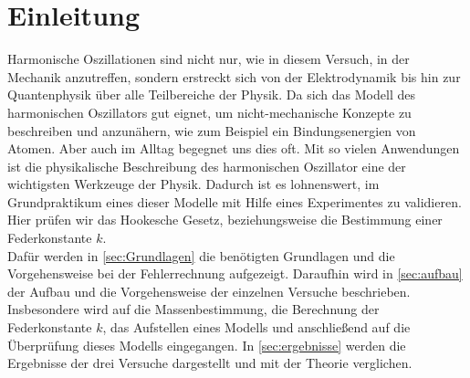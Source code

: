 \chapter{Einleitung}
\label{sec:einleitung}

Harmonische Oszillationen sind nicht nur, wie in diesem Versuch, in der Mechanik anzutreffen, sondern erstreckt sich von der Elektrodynamik bis hin zur Quantenphysik über alle Teilbereiche der Physik. Da sich das Modell des harmonischen Oszillators gut eignet, um nicht-mechanische Konzepte zu beschreiben und anzunähern, wie zum Beispiel ein Bindungsenergien von Atomen. Aber auch im Alltag begegnet uns dies oft. Mit so vielen Anwendungen ist die physikalische Beschreibung des harmonischen Oszillator eine der wichtigsten Werkzeuge der Physik. Dadurch ist es lohnenswert, im Grundpraktikum eines dieser Modelle mit Hilfe eines Experimentes zu validieren. Hier prüfen wir das Hookesche Gesetz, beziehungsweise die Bestimmung einer Federkonstante $k$.\\
Dafür werden in \autoref{sec:Grundlagen} die benötigten Grundlagen und die Vorgehensweise bei der Fehlerrechnung aufgezeigt. Daraufhin wird in \autoref{sec:aufbau} der Aufbau und die Vorgehensweise der einzelnen Versuche beschrieben. Insbesondere wird auf die Massenbestimmung, die Berechnung der Federkonstante $k$, das Aufstellen eines Modells und anschließend auf die Überprüfung dieses Modells eingegangen. In \autoref{sec:ergebnisse} werden die Ergebnisse der drei Versuche dargestellt und mit der Theorie verglichen.
